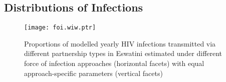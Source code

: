 \subsection{Distributions of Infections}\label{sr.foi.exp}
\begin{figure}
  \texttt{[image: foi.wiw.ptr]}
  \caption{Proportions of modelled yearly HIV infections
    transmitted via different partnership types in Eswatini
    estimated under different force of infection approaches (horizontal facets)
    with equal \vs approach-specific parameters (vertical facets)}
  \label{fig:foi.wiw.ptr}
\end{figure}
